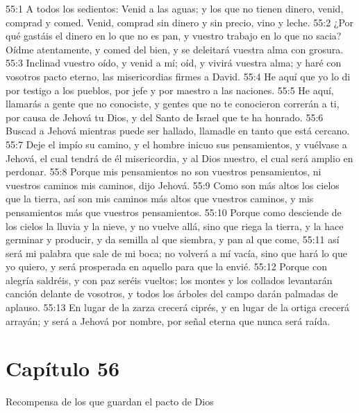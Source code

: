 55:1 A todos los sedientos: Venid a las aguas; y los que no tienen dinero, venid, comprad y comed. Venid, comprad sin dinero y sin precio, vino y leche. 
55:2 ¿Por qué gastáis el dinero en lo que no es pan, y vuestro trabajo en lo que no sacia? Oídme atentamente, y comed del bien, y se deleitará vuestra alma con grosura. 
55:3 Inclinad vuestro oído, y venid a mí; oíd, y vivirá vuestra alma; y haré con vosotros pacto eterno, las misericordias firmes a David. 
55:4 He aquí que yo lo di por testigo a los pueblos, por jefe y por maestro a las naciones. 
55:5 He aquí, llamarás a gente que no conociste, y gentes que no te conocieron correrán a ti, por causa de Jehová tu Dios, y del Santo de Israel que te ha honrado. 
55:6 Buscad a Jehová mientras puede ser hallado, llamadle en tanto que está cercano. 
55:7 Deje el impío su camino, y el hombre inicuo sus pensamientos, y vuélvase a Jehová, el cual tendrá de él misericordia, y al Dios nuestro, el cual será amplio en perdonar. 
55:8 Porque mis pensamientos no son vuestros pensamientos, ni vuestros caminos mis caminos, dijo Jehová. 
55:9 Como son más altos los cielos que la tierra, así son mis caminos más altos que vuestros caminos, y mis pensamientos más que vuestros pensamientos. 
55:10 Porque como desciende de los cielos la lluvia y la nieve, y no vuelve allá, sino que riega la tierra, y la hace germinar y producir, y da semilla al que siembra, y pan al que come,  
55:11 así será mi palabra que sale de mi boca; no volverá a mí vacía, sino que hará lo que yo quiero, y será prosperada en aquello para que la envié. 
55:12 Porque con alegría saldréis, y con paz seréis vueltos; los montes y los collados levantarán canción delante de vosotros, y todos los árboles del campo darán palmadas de aplauso. 
55:13 En lugar de la zarza crecerá ciprés, y en lugar de la ortiga crecerá arrayán; y será a Jehová por nombre, por señal eterna que nunca será raída. 
\section*{Capítulo 56 }
Recompensa de los que guardan el pacto de Dios 
 

